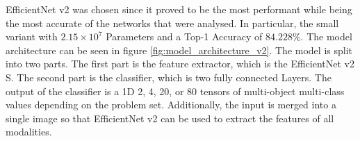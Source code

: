 EfficientNet v2 was chosen since it proved to be the most performant while being the most accurate of the networks that were analysed. In particular, the small variant with $2.15 \times 10^7$ Parameters and a Top-1 Accuracy of $84.228\%$. The model architecture can be seen in figure \ref{fig:model_architecture_v2}. The model is split into two parts. The first part is the feature extractor, which is the EfficientNet v2 S. The second part is the classifier, which is two fully connected Layers. The output of the classifier is a 1D 2, 4, 20, or 80 tensors of multi-object multi-class values depending on the problem set. Additionally, the input is merged into a single image so that EfficientNet v2 can be used to extract the features of all modalities.
